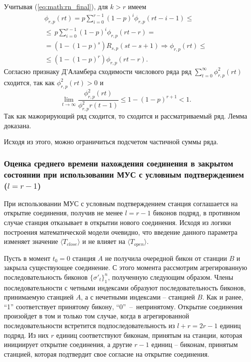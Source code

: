 Учитывая (\ref{eq:math:rn_final}), для $k>r$ имеем
\[
\begin{array}{c}
 \phi_{r,p}(rt) = p \sum \limits^{r-1}_{i=0} (1-p)^i \phi_{r,p}(rt-i-1) \leqslant
 \\
 \leqslant \,  p \sum \limits^{r-1}_{i=0} (1-p)^i \phi_{r,p}(rt-r) = \\
=\left( 1- (1-p)^{s}\right) R_{s,p}(st-s+1) \Rightarrow
\phi_{r,p}(rt)\leqslant \\
 \leqslant  \left( 1- (1-p)^{r}\right)
\phi_{r,p}(rt-r).
\end{array}
\]
Согласно признаку Д'Аламбера сходимости числового ряда \cite{Matan} ряд $\sum \limits^{\infty}_{t=0}
\phi_{r,p}^2(rt)$ сходится, так как $\phi_{r,p}^2(rt) >0$ и
\[
\lim_{t \rightarrow \infty} \frac{\phi_{r,p}^2(rt)}{\phi_{r,p}^2r(t-1)}
\leqslant  1- (1-p)^{r+1} <1.
\]
Так как мажорирующий ряд сходится, то сходится и рассматриваемый ряд. Лемма доказана.

Исходя из этого, можно ограничиться подсчетом частичной суммы ряда.

\subsubsection{Оценка среднего времени нахождения соединения в закрытом состоянии при использовании МУС с условным подтверждением ($l=r-1$)}

При использовании МУС с условным подтверждением станция соглашается на открытие соединения, получив не менее $l=r-1$ биконов подряд, в противном случае станция отказывает в открытии нового соединения.  Исходя из логики построения математической модели очевидно, что введение данного параметра изменяет значение $\langle T_{close} \rangle$ и не влияет на %
$\langle T_{open} \rangle$.

Пусть в момент $t_0=0$ станция $A$ не получила очередной бикон от станции $B$ и закрыла существующее соединение. С этого момента рассмотрим агрегированную последовательность биконов $\{\sigma'_t\}_1^n$, полученную следующим образом. Члены последовательности с четными индексами образуют последовательность биконов, принимаемую станцией $A$, а с нечетными индексами -- станцией $B$. Как и ранее, ``1'' соответствует принятому бикону, ``0''~--~непринятому. Открытие соединения произойдет в том и только том случае, когда в агрегированной последовательности встретится подпоследовательность из $l + r= 2r-1$ единиц подряд. Из них $r$ единиц соответствуют биконам, принятым на станции, которая инициирует открытие соединения, а другие $r-1$ единиц -- биконам, принятым станцией, которая подтвердит свое согласие на открытие соединения.


